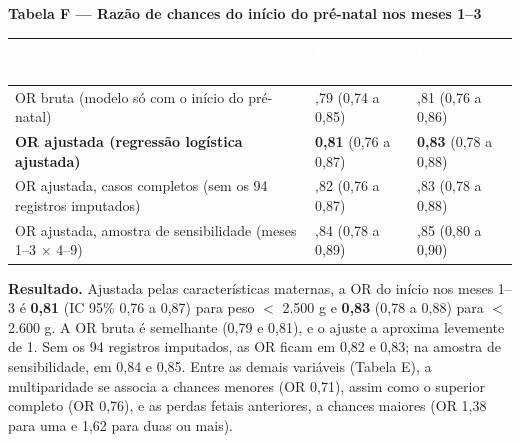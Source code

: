 \documentclass[10pt,a4paper]{article}
\newcommand{\vezes}{\ensuremath{\times}}
\newcommand{\menor}{\ensuremath{<}}
\begin{document}
\par\vspace{4pt}
{\footnotesize\bfseries\color{iptescuro} Tabela F --- Razão de chances do início do pré-natal nos meses 1--3\par}\vspace{2pt}
{\footnotesize\renewcommand{\arraystretch}{1.2}\setlength{\tabcolsep}{4pt}
\begin{tabular}{>{\raggedright\arraybackslash}p{} >{\centering\arraybackslash}p{} >{\centering\arraybackslash}p{}}
\rowcolor{iptazul}\textcolor{white}{\bfseries Modelo e amostra} & \textcolor{white}{\bfseries Peso \menor{} 2.500 g} & \textcolor{white}{\bfseries Peso \menor{} 2.600 g} \\ \hline
OR bruta (modelo só com o início do pré-natal) & 0,79 (0,74 a 0,85) & 0,81 (0,76 a 0,86) \\ \hline
\textbf{OR ajustada (regressão logística ajustada)} & \textbf{0,81} (0,76 a 0,87) & \textbf{0,83} (0,78 a 0,88) \\ \hline
OR ajustada, casos completos (sem os 94 registros imputados) & 0,82 (0,76 a 0,87) & 0,83 (0,78 a 0,88) \\ \hline
\rowcolor{iptfundo}OR ajustada, amostra de sensibilidade (meses 1--3 \vezes{} 4--9) & 0,84 (0,78 a 0,89) & 0,85 (0,80 a 0,90) \\ \hline
\end{tabular}\par}\par{}\par\vspace{6pt}


{\color{iptescuro}\bfseries Resultado.} Ajustada pelas características maternas, a OR do início nos meses 1--3 é \textbf{0,81} (IC 95\% 0,76 a 0,87) para peso \menor{} 2.500 g e \textbf{0,83} (0,78 a 0,88) para \menor{} 2.600 g. A OR bruta é semelhante (0,79 e 0,81), e o ajuste a aproxima levemente de 1. Sem os 94 registros imputados, as OR ficam em 0,82 e 0,83; na amostra de sensibilidade, em 0,84 e 0,85. Entre as demais variáveis (Tabela E), a multiparidade se associa a chances menores (OR 0,71), assim como o superior completo (OR 0,76), e as perdas fetais anteriores, a chances maiores (OR 1,38 para uma e 1,62 para duas ou mais).\par
\end{document}
